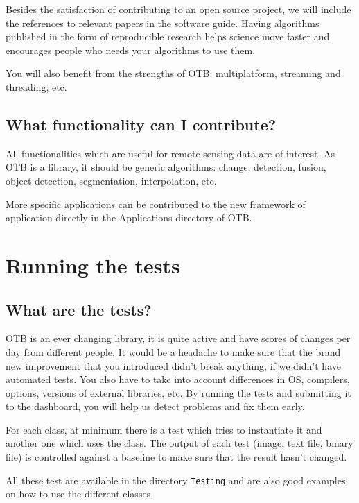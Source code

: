 Besides the satisfaction of contributing to an open source project, we will include
the references to relevant papers in the software guide. Having algorithms
published in the form of reproducible research helps science move faster and
encourages people who needs your algorithms to use them.

You will also benefit from the strengths of OTB: multiplatform, streaming and
threading, etc.

\subsection{What functionality can I contribute?}

All functionalities which are useful for remote sensing data are of interest. As
OTB is a library, it should be generic algorithms: change, detection, fusion,
object detection, segmentation, interpolation, etc.

More specific applications can be contributed to the new framework of application 
directly in the Applications directory of OTB.

\section{Running the tests}\label{sec:runningTheTests}

\subsection{What are the tests?}

OTB is an ever changing library, it is quite active and have scores of
changes per day from different people. It would be a headache to make
sure that the brand new improvement that you introduced didn't break
anything, if we didn't have automated tests. You also have to take into
account differences in OS, compilers, options, versions of external
libraries, etc. By running the tests and submitting it to the dashboard,
you will help us detect problems and fix them early.

For each class, at minimum there is a test which tries to instantiate it and another one which uses the class. The output of each test (image, text file, binary file) is controlled against a baseline to make sure that the result hasn't changed.

All these test are available in the directory \texttt{Testing} and are also good examples on how to use the different classes.

